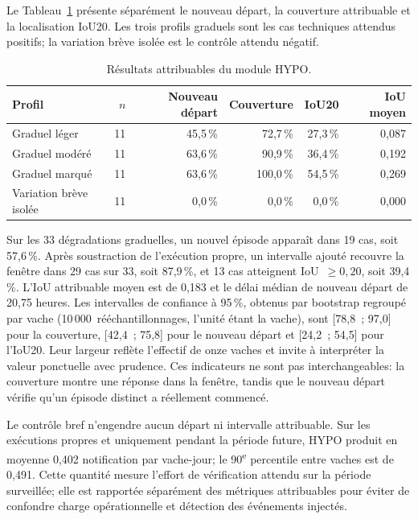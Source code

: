 Le Tableau~\ref{tab:hypo_profiles} présente séparément le nouveau départ, la couverture
attribuable et la localisation IoU20. Les trois profils graduels sont les cas techniques
attendus positifs; la variation brève isolée est le contrôle attendu négatif.

\begin{table}[H]
  \centering
  \caption{Résultats attribuables du module HYPO.}
  \label{tab:hypo_profiles}
  \small
  \begin{tabular}{lrrrrr}
    \toprule
    Profil & $n$ & Nouveau départ & Couverture & IoU20 & IoU moyen \\
    \midrule
    Graduel léger & 11 & 45,5\,\% & 72,7\,\% & 27,3\,\% & 0,087 \\
    Graduel modéré & 11 & 63,6\,\% & 90,9\,\% & 36,4\,\% & 0,192 \\
    Graduel marqué & 11 & 63,6\,\% & 100,0\,\% & 54,5\,\% & 0,269 \\
    Variation brève isolée & 11 & 0,0\,\% & 0,0\,\% & 0,0\,\% & 0,000 \\
    \bottomrule
  \end{tabular}
\end{table}

Sur les 33 dégradations graduelles, un nouvel épisode apparaît dans 19 cas, soit 57,6\,\%.
Après soustraction de l'exécution propre, un intervalle ajouté recouvre la fenêtre dans
29 cas sur 33, soit 87,9\,\%, et 13 cas atteignent IoU~$\geq0{,}20$, soit 39,4\,\%.
L'IoU attribuable moyen est de 0,183 et le délai médian de nouveau départ de 20,75 heures.
Les intervalles de confiance à 95\,\%, obtenus par bootstrap regroupé par vache
\citep{efron1993introduction,fieldwelsh2007bootstrapping}
(10\,000~rééchantillonnages, l'unité étant la vache), sont [78,8~; 97,0] pour la couverture,
[42,4~; 75,8] pour le nouveau départ et [24,2~; 54,5] pour l'IoU20. Leur largeur reflète
l'effectif de onze vaches et invite à interpréter la valeur ponctuelle avec prudence.
Ces indicateurs ne sont pas interchangeables: la couverture montre une réponse dans la
fenêtre, tandis que le nouveau départ vérifie qu'un épisode distinct a réellement commencé.

Le contrôle bref n'engendre aucun départ ni intervalle attribuable. Sur les exécutions
propres et uniquement pendant la période future, HYPO produit en moyenne 0,402
notification par vache-jour; le 90\textsuperscript{e} percentile entre vaches est de 0,491.
Cette quantité mesure l'effort de vérification attendu sur la période surveillée; elle est
rapportée séparément des métriques attribuables pour éviter de confondre charge opérationnelle
et détection des événements injectés.

